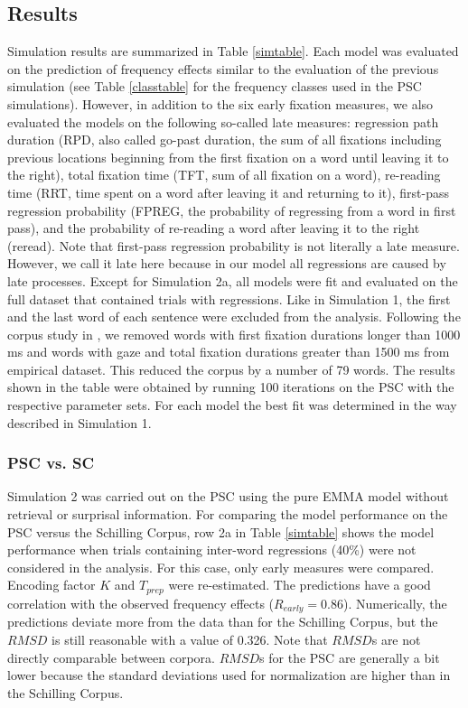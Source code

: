 \subsection{Results}
Simulation results are summarized in Table \ref{simtable}.  Each model was evaluated on the prediction of frequency effects similar to the evaluation of the previous simulation (see Table \ref{classtable} for the frequency classes used in the PSC simulations). However, in addition to the six early fixation measures, we also evaluated the models on the following so-called late measures:  regression path duration (RPD, also called go-past duration, the sum of all fixations including previous locations beginning from the first fixation on a word until leaving it to the right),  total fixation time (TFT, sum of all fixation on a word),  re-reading time (RRT, time spent on a word after leaving it and returning to it),  first-pass regression probability  (FPREG, the probability of regressing from a word in first pass), and the probability of re-reading a word after leaving it to the right (reread).  Note that first-pass regression probability is not literally a late measure.  However, we call it late here because in our model all regressions are caused by late processes.
Except for Simulation 2a, all models were fit and evaluated on the full dataset that contained trials with regressions.  
Like in Simulation 1, the first and the last word of each sentence were excluded from the analysis.  Following the corpus study in \cite{Kliegl2004}, we removed words with first fixation durations longer than 1000 ms and words with gaze and total fixation durations greater than 1500 ms from empirical dataset. This reduced the corpus by a number of 79 words. The results shown in the table were obtained by running 100 iterations on the PSC with the respective parameter sets.
For each model the best fit was determined in the way described in Simulation 1.

\subsubsection{PSC vs. SC}
Simulation 2 was carried out on the PSC using the pure EMMA model without retrieval or surprisal information.
For comparing the model performance on the PSC versus the Schilling Corpus, row 2a in Table \ref{simtable} shows the model performance when trials containing inter-word regressions (40\%) were not considered in the analysis.  For this case, only early measures were compared.  Encoding factor $K$ and $T_{prep}$ were re-estimated.  The predictions have a good correlation with the observed frequency effects ($R_{early} = 0.86$).  Numerically, the predictions deviate more from the data than for the Schilling Corpus, but the $RMSD$ is still reasonable with a value of 0.326.  Note that $RMSD$s are not directly comparable between corpora.  $RMSD$s for the PSC are generally a bit lower because the standard deviations used for normalization are higher than in the Schilling Corpus.

